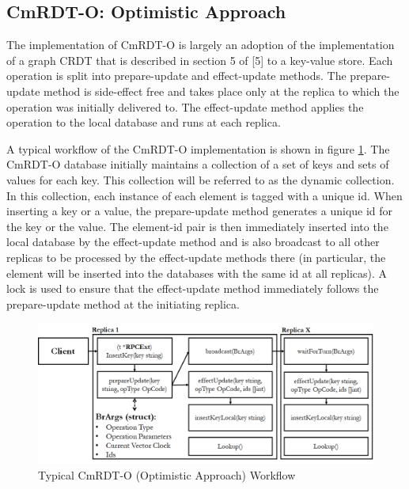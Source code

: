 \documentclass[sigconf,nonacm,10pt]{acmart}
\begin{document}
\subsection{CmRDT-O: Optimistic Approach}
The implementation of CmRDT-O is largely an adoption of the implementation of a graph CRDT that is described in section 5 of [5] to a key-value store. Each operation is split into prepare-update and effect-update methods. The prepare-update method is side-effect free and takes place only at the replica to which the operation was initially delivered to. The effect-update method applies the operation to the local database and runs at each replica.

A typical workflow of the CmRDT-O implementation is shown in figure \ref{fig:cmrdtb}. The CmRDT-O database initially maintains a collection of a set of keys and sets of values for each key. This collection will be referred to as the dynamic collection. In this collection, each instance of each element is tagged with a unique id. When inserting a key or a value, the prepare-update method generates a unique id for the key or the value. The element-id pair is then immediately inserted into the local database by the effect-update method and is also broadcast to all other replicas to be processed by the effect-update methods there (in particular, the element will be inserted into the databases with the same id at all replicas). A lock is used to ensure that the effect-update method immediately follows the prepare-update method at the initiating replica.

\begin{figure}[h]
  \centering
  \includegraphics[width=15.5cm]{Fig4CmRDTB}
  \caption{Typical CmRDT-O (Optimistic Approach) Workflow}
  \label{fig:cmrdtb}
\end{figure}
\end{document}

